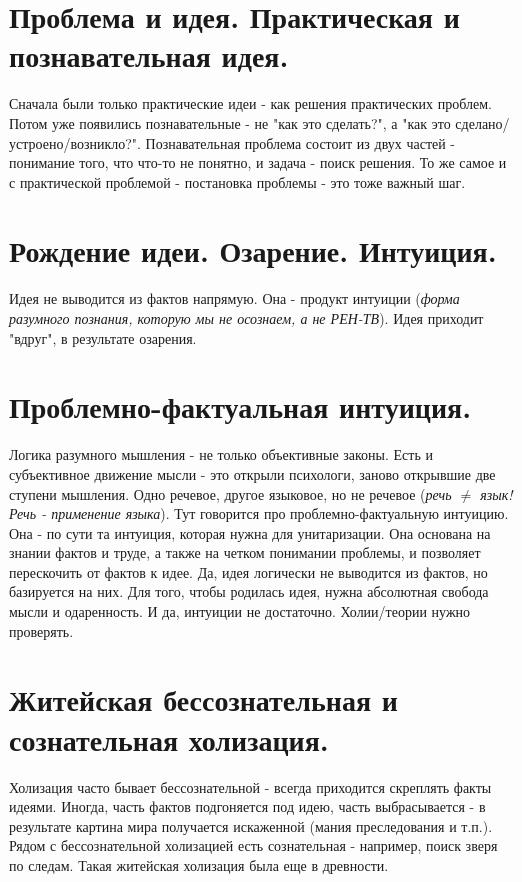 \section{ Проблема и идея. Практическая и познавательная идея.}
Сначала были только практические идеи - как решения практических проблем. Потом уже появились познавательные - не "как это сделать?", а "как это сделано/устроено/возникло?". Познавательная проблема состоит из двух частей - понимание того, что что-то не понятно, и задача - поиск решения. То же самое и с практической проблемой - постановка проблемы - это тоже важный шаг.

\section{ Рождение идеи. Озарение. Интуиция.}
Идея не выводится из фактов напрямую. Она - продукт интуиции (\textit{форма разумного познания, которую мы не осознаем, а не РЕН-ТВ}). Идея приходит "вдруг", в результате озарения. 

\section{ Проблемно-фактуальная интуиция.}
Логика разумного мышления - не только объективные законы. Есть и субъективное движение мысли - это открыли психологи, заново открывшие две ступени мышления. Одно речевое, другое языковое, но не речевое (\textit{речь $\ne$ язык! Речь - применение языка}). Тут говорится про проблемно-фактуальную интуицию. Она - по сути та интуиция, которая нужна для унитаризации. Она основана на знании фактов и труде, а также на четком понимании проблемы, и позволяет перескочить от фактов к идее. Да, идея логически не выводится из фактов, но базируется на них. Для того, чтобы родилась идея, нужна абсолютная свобода мысли и одаренность. И да, интуиции не достаточно. Холии/теории нужно проверять.

\section{ Житейская бессознательная и сознательная холизация. }
Холизация часто бывает бессознательной - всегда приходится скреплять факты идеями. Иногда, часть фактов подгоняется под идею, часть выбрасывается - в результате картина мира получается искаженной (мания преследования и т.п.). Рядом с бессознательной холизацией есть сознательная - например, поиск зверя по следам. Такая житейская холизация была еще в древности.

